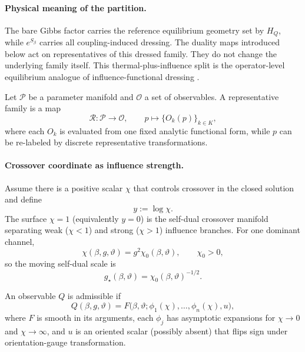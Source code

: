 \paragraph{Physical meaning of the partition.}
The bare Gibbs factor carries the reference equilibrium geometry set by \(H_Q\), while
\(e^{S_\beta}\) carries all coupling-induced dressing.
The duality maps introduced below act on representatives of this dressed family.
They do not change the underlying family itself. This thermal-plus-influence split is the
operator-level equilibrium analogue of influence-functional dressing
\cite{feynmanTheoryGeneralQuantum1963a,mccaulMeanForceHamiltoniansInfluence2026}.

\begin{definition}
\label{def:rep_family}
Let \(\mathcal{P}\) be a parameter manifold and \(\mathcal{O}\) a set of observables.
A representative family is a map
\begin{equation}
  \mathcal{R}: \mathcal{P}\to \mathcal{O}, \qquad
  p \mapsto \{O_k(p)\}_{k\in K},
\end{equation}
where each \(O_k\) is evaluated from one fixed analytic functional form, while \(p\) can be
re-labeled by discrete representative transformations.
\end{definition}

\paragraph{Crossover coordinate as influence strength.}
Assume there is a positive scalar \(\chi\) that controls crossover in the closed solution and define
\begin{equation}
  y:=\log\chi.
\end{equation}
The surface \(\chi=1\) (equivalently \(y=0\)) is the self-dual crossover manifold separating weak
(\(\chi<1\)) and strong (\(\chi>1\)) influence branches.
For one dominant channel,
\begin{equation}
  \chi(\beta,g,\vartheta)=g^2\chi_0(\beta,\vartheta),\qquad \chi_0>0,
\end{equation}
so the moving self-dual scale is
\begin{equation}
  g_\star(\beta,\vartheta)=\chi_0(\beta,\vartheta)^{-1/2}.
\end{equation}

\begin{definition}
\label{def:admissible_class}
An observable \(Q\) is admissible if
\begin{equation}
  Q(\beta,g,\vartheta)=F\!\bigl(\beta,\vartheta;\phi_1(\chi),\ldots,\phi_n(\chi),u\bigr),
\end{equation}
where \(F\) is smooth in its arguments, each \(\phi_j\) has asymptotic expansions for
\(\chi\to0\) and \(\chi\to\infty\), and \(u\) is an oriented scalar (possibly absent) that flips
sign under orientation-gauge transformation.
\end{definition}

